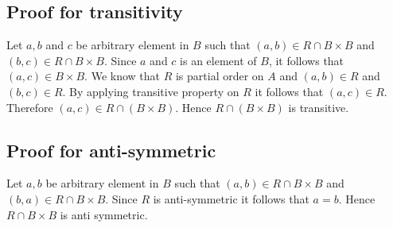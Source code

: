 \documentclass{article}
\begin{document}
\subsection{Proof for transitivity}

Let $a,b$ and $c$ be arbitrary element in $B$ such that $(a,b) \in R
\cap B \times B$ and $(b,c) \in R \cap B \times B$. Since $a$ and $c$
is an element of $B$, it follows that $(a,c) \in B \times B$. We know
that $R$ is partial order on $A$ and $(a,b) \in R$ and $(b,c) \in R$.
By applying transitive property on $R$ it follows that $(a,c) \in R$.
Therefore $(a,c) \in R \cap (B \times B)$. Hence $R \cap (B \times B)$
is transitive.

\subsection{Proof for anti-symmetric}
Let $a,b$ be arbitrary element in $B$ such that $(a,b) \in R \cap B
\times B$ and $(b,a) \in R \cap B \times B$. Since $R$ is
anti-symmetric it follows that $a = b$. Hence $R \cap B \times B$ is
anti symmetric.
\end{document}
